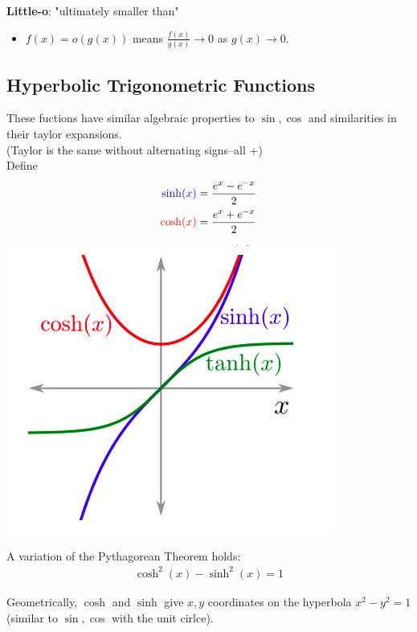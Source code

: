 \documentclass[a4paper, 12pt]{article}
\newcommand{\bt}[1]{\textbf{#1}} %
\newcommand{\eq}[1]{\begin{align*}#1\end{align*}} %
\renewcommand{\eq}[1]{\begin{align*}#1\end{align*}} %
\newcommand{\gray}[1]{\textcolor[gray]{0.5}{#1}} %
\newcommand{\blue}[1]{\textcolor{blue}{#1}} %
\newcommand{\tab}{\phantom{ssss}}
\begin{document}
\noindent \bt{Little-o}: "ultimately smaller than"
\begin{itemize}
    \item $f(x) = o(g(x))$ means $\displaystyle \frac{f(x)}{g(x)} \rightarrow 0$ as $g(x) \rightarrow 0$.
\end{itemize}


\subsection{Hyperbolic Trigonometric Functions}

These fuctions have similar algebraic properties to $\sin, \cos$ and similarities in their taylor expansions. \\
\gray{(Taylor is the same without alternating signs--all +)}\\
Define 
\eq{
\blue{\sinh(x)} = \frac{e^x - e^{-x}}{2} \\
\textcolor{red}{\cosh(x)} = \frac{e^{x} + e^{-x}}{2} \\
}

\includegraphics[scale=0.5]{htrig.png}

A variation of the Pythagorean Theorem holds: 
\eq{
\cosh^2(x) - \sinh^2(x) = 1
}

Geometrically, $\cosh$ and $\sinh$ give $x,y$ coordinates on the hyperbola $x^2 - y^2=1$ \\
\tab \tab (similar to $\sin, \cos$ with the unit cirlce).\\
\end{document}
